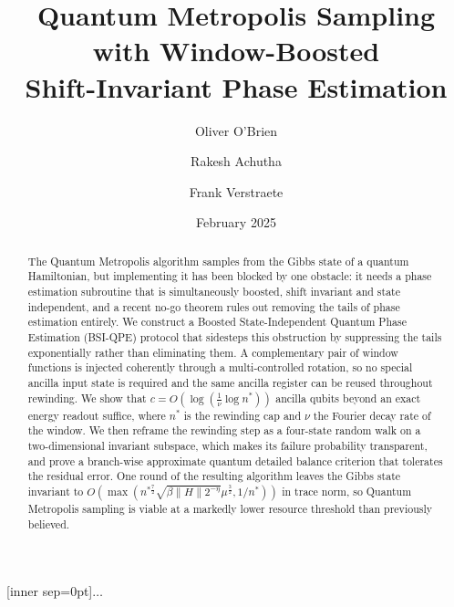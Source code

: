 \documentclass[aps,floatfix,10pt,amssymb,amsfont,amsmath,superscriptaddress,float,nofootinbib,longbibliography,nobalancelastpage,twocolumn]{revtex4-2}
\date{February 2025}
\begin{document}
[inner sep=0pt]{$\dots$}

\title{Quantum Metropolis Sampling with Window-Boosted\\ Shift-Invariant Phase Estimation}
\author{Oliver O'Brien}
\author{Rakesh Achutha}
\author{Frank Verstraete}

\begin{abstract}
    The Quantum Metropolis algorithm samples from the Gibbs state of a quantum Hamiltonian, but implementing it has been blocked by one obstacle: it needs a phase estimation subroutine that is simultaneously boosted, shift invariant and state independent, and a recent no-go theorem rules out removing the tails of phase estimation entirely. We construct a Boosted State-Independent Quantum Phase Estimation (BSI-QPE) protocol that sidesteps this obstruction by suppressing the tails exponentially rather than eliminating them. A complementary pair of window functions is injected coherently through a multi-controlled rotation, so no special ancilla input state is required and the same ancilla register can be reused throughout rewinding. We show that $c = O(\log(\frac{1}{\nu}\log n^*))$ ancilla qubits beyond an exact energy readout suffice, where $n^*$ is the rewinding cap and $\nu$ the Fourier decay rate of the window. We then reframe the rewinding step as a four-state random walk on a two-dimensional invariant subspace, which makes its failure probability transparent, and prove a branch-wise approximate quantum detailed balance criterion that tolerates the residual error. One round of the resulting algorithm leaves the Gibbs state invariant to $O(\max(n^{*\frac{7}{2}}\sqrt{\beta\|H\|2^{-\eta}}\mu^{\frac{3}{2}},1/n^*))$ in trace norm, so Quantum Metropolis sampling is viable at a markedly lower resource threshold than previously believed.
\end{abstract}
\end{document}
